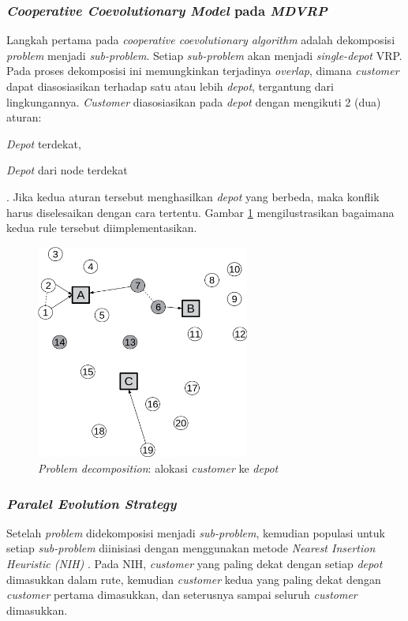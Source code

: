 \subsubsection{\textit{Cooperative Coevolutionary Model} pada \textit{MDVRP}}
Langkah pertama pada \textit{cooperative coevolutionary algorithm} adalah dekomposisi \textit{problem} menjadi \textit{sub-problem}. Setiap \textit{sub-problem} akan menjadi \textit{single-depot} VRP. Pada proses dekomposisi ini memungkinkan terjadinya \textit{overlap}, dimana \textit{customer} dapat diasosiasikan terhadap satu atau lebih \textit{depot}, tergantung dari lingkungannya. \textit{Customer} diasosiasikan pada \textit{depot} dengan mengikuti 2 (dua) aturan:
\begin{inparaenum}[1)]
\item \textit{Depot} terdekat,
\item \textit{Depot} dari node terdekat
\end{inparaenum}.
Jika kedua aturan tersebut menghasilkan \textit{depot} yang berbeda, maka konflik harus diselesaikan dengan cara tertentu. Gambar \ref{fig:coes_problem_decomposition} mengilustrasikan bagaimana kedua rule tersebut diimplementasikan.


\begin{figure}[!]
	\centering
	\includegraphics[width=7cm]{../../Resources/Images/coes_problem_decomposition}
	\caption{\textit{Problem decomposition}: alokasi \textit{customer} ke \textit{depot}}
	\label{fig:coes_problem_decomposition}
\end{figure}


\subsubsection{\textit{Paralel Evolution Strategy}}
Setelah \textit{problem} didekomposisi menjadi \textit{sub-problem}, kemudian populasi untuk setiap \textit{sub-problem} diinisiasi dengan menggunakan metode \textit{Nearest Insertion Heuristic (NIH)} \citep{raff_routing_1983}. Pada NIH, \textit{customer} yang paling dekat dengan setiap \textit{depot} dimasukkan dalam rute, kemudian \textit{customer} kedua yang paling dekat dengan \textit{customer} pertama dimasukkan, dan seterusnya sampai seluruh \textit{customer} dimasukkan.


